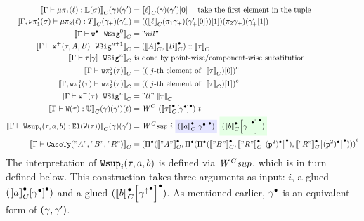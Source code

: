 \begin{align*}
%
%
  \denotesC{\goodTerm{\Gm}{\lkgproj{1}{\lkg}}{\TyLkg{\lsig}}}(\gm)(\gm') &= \denotesC{\ell}(\gm)(\gm')[0] \quad \text{ take the first element in the tuple} \\
  \denotesC{\goodTerm{\Gm, \lsigprojT{\lsig}}{\lkgproj{2}{\lkg}}{T}}(\gm_+)(\gm_+') &= ((\denotesC{\ell}(\pi_1{\gm_+})(\gm_+'[0]))[1])(\pi_2{\gm_+})(\gm_+'[1]) \\
  \denotesC{\goodWSig{\Gm}{\WSigEmp}{0}} &= "nil" \\
  \denotesC{\goodWSig{\Gm}{\WSigAdd{\wsig}{A}{B}}{n+1}} &= (\denotesCC{A} , \denotesCC{B}) :: \denotesC{\wsig}\\
  \denotesC{\goodWSig{\Gm}{\sub{\wsig}{\gm}}{n}} & \text{ is done by point-wise/component-wise substitution} \\
  \denotesC{\goodType{\Gm}{\wsigproj{j}{1}{\wsig}}{}} &= \Gmodel{(\text{ $j$-th element of }~\denotesC{\wsig})[0]}\\
  \denotesC{\goodType{\Gm, \wsigproj{j}{1}{\wsig}}{\wsigproj{j}{2}{\wsig}}{}} &= \Gmodel{(\text{ $j$-th element of }~\denotesC{\wsig})[1]}\\
  \denotesC{\goodWSig{\Gm}{\WSigSub{\wsig}}{n}} &= "tl"~\denotesC{\wsig}\\
  \denotesC{\goodTerm{\Gm}{\wcode{\wsig}}{\cU}}(\gm)(\gm')(t) &= \CWmodel~(\Gsub{\denotesCC{\wsig}}{\Glued{\gm}})~t \\
  \denotesC{\goodTerm{\Gm}{\Wsup{i}{\wsig}{a}{b}}{\El{\wcode{\wsig}}}}(\gm)(\gm') &= \CWsup~i~
  \colorbox{blue!10}{(\Gsub{\denotesCC{a}}{\Glued{\gm}})}~
  \colorbox{green!10}{(\Gsub{\denotesCC{b}}{{\Glued{\gm^\uparrow}}})} \\
  \denotesC{\goodType{\Gm}{\CaseSig{"A"}{"B"}{"R"}}{}} &= 
  \Gmodel{\GluedPi{\denotesCC{"A"}}{\GluedPi {\GluedPi{\denotesCC{"B"}}{\Gsub{\denotesCC{"R"}}{\GSubstWeak{2}}}} {\Gsub{\denotesCC{"R"}}{\GSubstWeak{2}}}}} \\
\end{align*}
The interpretation of $\texttt{Wsup}_{i}({\tau},{a},{b})$ is defined via $\mathit{W^Csup}$, which is
in turn defined below. This construction takes three arguments as input: $i$, a glued
$({{\llbracket {a} \rrbracket}_C^\bullet}\!\left[{{\gamma}^\bullet}\right]^\bullet)$ and a glued
$({{\llbracket {b} \rrbracket}_C^\bullet}\!\left[{{{\gamma^\uparrow}^\bullet}}\right]^\bullet)$.  As mentioned earlier,
${\gamma}^\bullet$ is an equivalent form of $(\gamma, \gamma')$.

